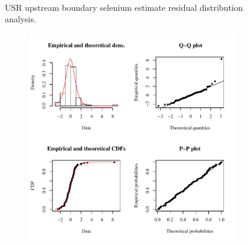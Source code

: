 \begin{linenumbers}
\begin{landscape}
\begin{figure}
\begin{subfigure}{0.7\textwidth}
		\end{subfigure}\\
		\caption{USR upstream boundary selenium estimate residual distribution analysis.}
	\end{figure}
\end{landscape}

\subfiguremid
\begin{landscape}
	\begin{figure}
		\begin{subfigure}{0.7\textwidth}
			\centering
			\includegraphics[width=\tableCustomSize]{"Figures/Results_USR/Stochastic/Conc Model res-fit UDIV"}
		\end{subfigure}%
		\begin{subfigure}{0.7\textwidth}
			\centering

\end{subfigure}
\end{figure}
\end{landscape}
\end{linenumbers}
